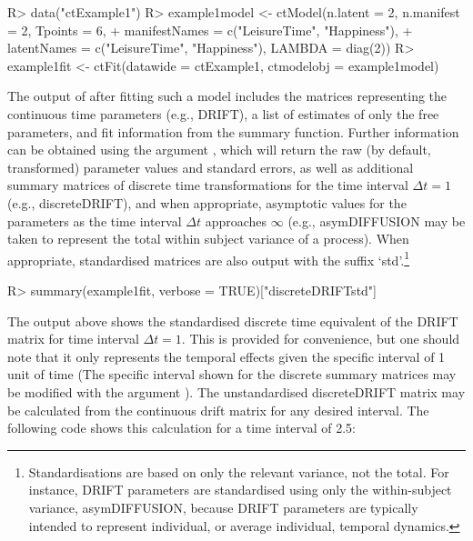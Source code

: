 \documentclass[nojss]{jss}\usepackage[]{graphicx}\usepackage[]{color}
\begin{document}
\begin{Schunk}
\begin{Sinput}
R> data("ctExample1")
R> example1model <- ctModel(n.latent = 2, n.manifest = 2, Tpoints = 6, 
+   manifestNames = c("LeisureTime", "Happiness"), 
+   latentNames = c("LeisureTime", "Happiness"), LAMBDA = diag(2))
R> example1fit <- ctFit(datawide = ctExample1, ctmodelobj = example1model)
\end{Sinput}
\end{Schunk}

The output of  after fitting such a model includes the matrices representing the continuous time parameters (e.g., DRIFT), a list of estimates of only the free parameters, and fit information from the  summary function. Further information can be obtained using the argument , which will return the raw (by default, transformed)  parameter values and standard errors, as well as additional summary matrices of discrete time transformations for the time interval $\Delta t = 1$ (e.g., discreteDRIFT), and when appropriate, asymptotic values for the parameters as the time interval $\Delta t$ approaches $\infty $ (e.g., asymDIFFUSION may be taken to represent the total within subject variance of a process). When appropriate, standardised matrices are also output with the suffix `std'.\footnote{Standardisations are based on only the relevant variance, not the total. For instance, DRIFT parameters are standardised using only the within-subject variance, asymDIFFUSION, because DRIFT parameters are typically intended to represent individual, or average individual, temporal dynamics.}   

\begin{Schunk}
\begin{Sinput}
R> summary(example1fit, verbose = TRUE)["discreteDRIFTstd"]
\end{Sinput}
\end{Schunk}

The output above shows the standardised discrete time equivalent of the DRIFT matrix for time interval $\Delta t = 1$. This is provided for convenience, but one should note that it only represents the temporal effects given the specific interval of 1 unit of time (The specific interval shown for the discrete summary matrices may be modified with the argument ).  The unstandardised discreteDRIFT matrix may be calculated from the continuous drift matrix for any desired interval. The following code shows this calculation for a time interval of 2.5: 
\end{document}
